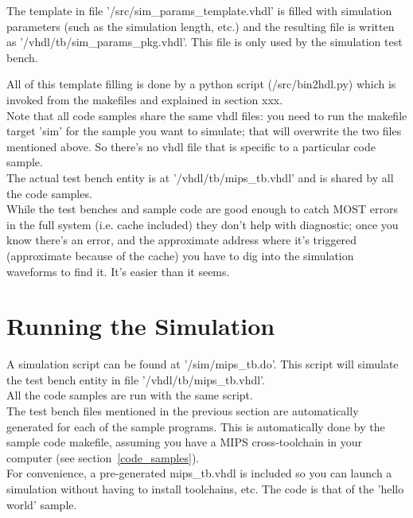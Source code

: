    The template in file '/src/sim\_params\_template.vhdl' is filled with 
    simulation parameters (such as the simulation length, etc.) and the resulting 
    file is written as '/vhdl/tb/sim\_params\_pkg.vhdl'. This file is only used
    by the simulation test bench.
    
    All of this template filling is done by a python script (/src/bin2hdl.py) 
    which is invoked from the makefiles and explained in section xxx.\\
    
    Note that all code samples share the same vhdl files: you need to run the 
    makefile target 'sim' for the sample you want to simulate; that will 
    overwrite the two files mentioned above. So there's no vhdl file that is
    specific to a particular code sample.\\
    
    The actual test bench entity is at '/vhdl/tb/mips\_tb.vhdl' and is shared 
    by all the code samples.\\
    
    While the test benches and sample code are good enough to catch MOST errors
    in the full system (i.e. cache included) they don't help with diagnostic;
    once you know there's an error, and the approximate address where it's
    triggered (approximate because of the cache) you have to dig into the 
    simulation waveforms to find it. It's easier than it seems.\\
    
\section{Running the Simulation}
\label{running_the_simulation}

    A simulation script can be found at '/sim/mips\_tb.do'. This script will
    simulate the test bench entity in file '/vhdl/tb/mips\_tb.vhdl'.\\
    
    All the code samples are run with the same script.\\

    The test bench files mentioned in the previous section are automatically 
    generated for each of the sample programs. This is automatically done by the 
    sample code makefile,
    assuming you have a MIPS cross-toolchain in your computer (see section~\ref{code_samples}).\\

    For convenience, a pre-generated mips\_tb.vhdl is included so you can launch
    a simulation without having to install toolchains, etc. The code is that
    of the 'hello world' sample.\\

